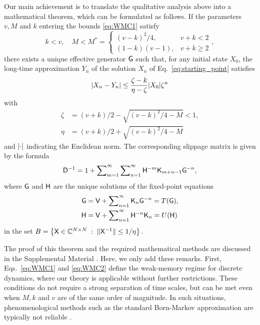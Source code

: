 \documentclass[aps,prl,reprint]{revtex4-2}
\begin{document}
Our main achievement is to translate the qualitative analysis above into a mathematical theorem, which can be formulated as follows.
If the parameters $v, M$ and $k$ entering the bounds \eqref{eq:WMC1} satisfy
\begin{equation}\label{eq:WMC2}
	k<v, \quad
	M < M^\ast =
		\begin{cases}
			(v-k)^2/4, & v+k <2\\
			(1-k)(v-1),& v+k \geq 2
		\end{cases},
\end{equation}
there exists a unique effective generator $\mathsf{G}$ such that, for any initial state $X_0$, the long-time approximation $Y_n$ of the solution $X_n$ of Eq.~\eqref{eq:starting_point} satisfies
\begin{equation}\label{eq:BndErrLTA}
	\lvert X_n - Y_n \rvert\leq \frac{\zeta-k}{\eta-\zeta}\lvert X_0 \rvert\zeta^n
\end{equation}
with
\begin{align}
	\zeta & = (v+k)/2 - \sqrt{(v-k)^2/4 -M} < 1,\\
	\eta & = (v+k)/2 + \sqrt{(v-k)^2/4- M}
\end{align}
and $\lvert \cdot \rvert$ indicating the Euclidean norm.
The corresponding slippage matrix is given by the formula
\begin{equation}\label{eq:SMDef}
	\mathsf{D}^{-1} = 1 + \sum\nolimits_{m=1}^\infty\sum\nolimits_{n=1}^\infty \mathsf{H}^{-m}\mathsf{K}_{m+n-1}\mathsf{G}^{-n},
\end{equation}
where $\mathsf{G}$ and $\mathsf{H}$ are the unique solutions of the fixed-point equations
\begin{align}
	\label{eq:GFPE}
	\mathsf{G} & = \mathsf{V} + \sum\nolimits_{n=1}^\infty \mathsf{K}_n \mathsf{G}^{-n} = T(\mathsf{G}),\\
	\label{eq:HFPE}
	\mathsf{H} & = \mathsf{V} + \sum\nolimits_{n=1}^\infty \mathsf{H}^{-n}\mathsf{K}_n  = U(\mathsf{H})
\end{align}
in the set $	B=\bigl\{\mathsf{X}\in\mathbb{C}^{N\times N} \; : \; \lVert \mathsf{X}^{-1} \rVert\leq 1/\eta\bigr\}$.


The proof of this theorem and the required mathematical methods are discussed in the Supplemental Material \cite{meyerWeakMemoryDynamicsDiscrete2025}\nocite{agarwalFixedPointTheory2018,hornMatrixAnalysis2013,rivasOpenQuantumSystems2012,
burtonVolterraIntegralDifferential2005}. Here, we only add three remarks. First, Eqs.~\eqref{eq:WMC1} and \eqref{eq:WMC2} define the weak-memory regime for discrete dynamics, where our theory is applicable without further restrictions.
These conditions do not require a strong separation of time scales, but can be met even when $M, k$ and $v$ are of the same order of magnitude.
In such situations, phenomenological methods such as the standard Born-Markov approximation are typically not reliable \cite{strunzConvolutionlessNonMarkovian2004, flemingAccuracyPerturbativeMaster2011, hartmannAccuracyAssessmentPerturbative2020, tellobreuerBenchmarkingQuantumMaster2024, sartipiCanonicallyConsistentQuantumMaster2026}.
\end{document}
